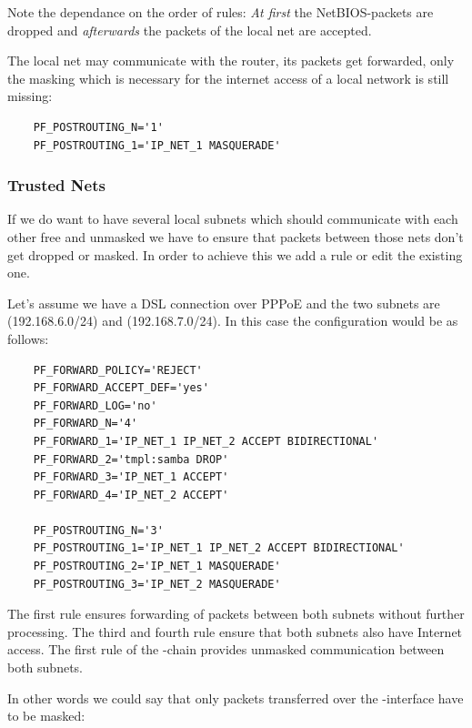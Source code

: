 Note the dependance on the order of rules: \emph{At first} the
NetBIOS-packets are dropped and \emph{afterwards} the packets of
the local net are accepted.

The local net may communicate with the router, its packets get forwarded,
only the masking which is necessary for the internet access of a local
network is still missing:

\begin{example}
\begin{verbatim}
    PF_POSTROUTING_N='1'
    PF_POSTROUTING_1='IP_NET_1 MASQUERADE'
\end{verbatim}
\end{example}

\subsubsection{Trusted Nets}

If we do want to have several local subnets which should communicate with
each other free and unmasked we have to ensure that packets between those nets
don't get dropped or masked. In order to achieve this we add a rule or edit
the existing one.

Let's assume we have a DSL connection over PPPoE and the two subnets are
 (192.168.6.0/24) and  (192.168.7.0/24).
In this case the configuration would be as follows:

\begin{example}
\begin{verbatim}
    PF_FORWARD_POLICY='REJECT'
    PF_FORWARD_ACCEPT_DEF='yes'
    PF_FORWARD_LOG='no'
    PF_FORWARD_N='4'
    PF_FORWARD_1='IP_NET_1 IP_NET_2 ACCEPT BIDIRECTIONAL'
    PF_FORWARD_2='tmpl:samba DROP'
    PF_FORWARD_3='IP_NET_1 ACCEPT'
    PF_FORWARD_4='IP_NET_2 ACCEPT'

    PF_POSTROUTING_N='3'
    PF_POSTROUTING_1='IP_NET_1 IP_NET_2 ACCEPT BIDIRECTIONAL'
    PF_POSTROUTING_2='IP_NET_1 MASQUERADE'
    PF_POSTROUTING_3='IP_NET_2 MASQUERADE'
\end{verbatim}
\end{example}

The first rule ensures forwarding of packets between both subnets without further
processing. The third and fourth rule ensure that both subnets also have Internet
access. The first rule of the -chain provides unmasked
communication between both subnets.

In other words we could say that only packets transferred over the
-interface have to be masked:

